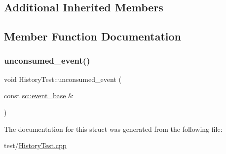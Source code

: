 \subsection*{Additional Inherited Members}


\subsection{Member Function Documentation}
\mbox{\label{struct_history_test_a1f30116031e8a0146c09aa1fce7958d4}} 
\subsubsection{\texorpdfstring{unconsumed\+\_\+event()}{unconsumed\_event()}}
{\footnotesize\ttfamily void History\+Test\+::unconsumed\+\_\+event (\begin{DoxyParamCaption}\item[{const \mbox{\hyperlink{classboost_1_1statechart_1_1event__base}{sc\+::event\+\_\+base}} \&}]{ }\end{DoxyParamCaption})\hspace{0.3cm}{\ttfamily [inline]}}



The documentation for this struct was generated from the following file\+:\begin{DoxyCompactItemize}
\item 
test/\mbox{\hyperlink{_history_test_8cpp}{History\+Test.\+cpp}}\end{DoxyCompactItemize}
